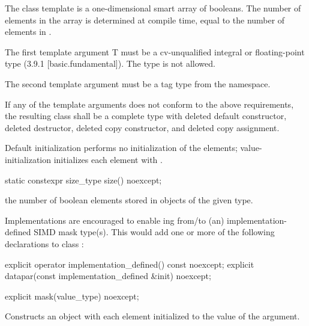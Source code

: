 

\pnum The class template \mask[<T, Abi>] is a one-dimensional smart array of booleans.
The number of elements in the array is determined at compile time, equal to the number of elements in \datapar[<T, Abi>].

\pnum The first template argument \type T must be a cv-unqualified integral or floating-point type (3.9.1 [basic.fundamental]).
The type \bool is not allowed.

\pnum The second template argument  must be a tag type from the  namespace.

\pnum If any of the template arguments does not conform to the above requirements, the resulting class shall be a complete type with deleted default constructor, deleted destructor, deleted copy constructor, and deleted copy assignment.

\pnum Default initialization performs no initialization of the elements; value-initialization initializes each element with .

\begin{itemdecl}
static constexpr size_type size() noexcept;
\end{itemdecl}
\begin{itemdescr}
  \pnum\returns the number of boolean elements stored in objects of the given \mask[<T, Abi>] type.
\end{itemdescr}

\pnum\realnote Implementations are encouraged to enable ing from/to (an) implementation-defined SIMD mask type(s).
This would add one or more of the following declarations to class \mask:
\begin{itemdecl}
explicit operator implementation_defined() const noexcept;
explicit datapar(const implementation_defined &init) noexcept;
\end{itemdecl}

\begin{itemdecl}
explicit mask(value_type) noexcept;
\end{itemdecl}
\begin{itemdescr}
  \pnum\effects Constructs an object with each element initialized to the value of the argument.
\end{itemdescr}


